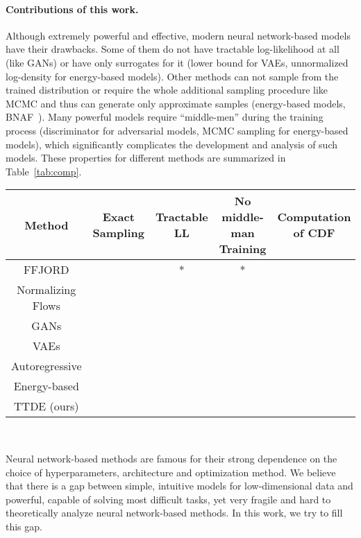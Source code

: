 \documentclass[accepted]{uai2021}
\newcommand{\cmark}{\color{green}{\ding{51}}}%
\newcommand{\xmark}{\color{red}{\ding{55}}}%
\begin{document}
  \paragraph{Contributions of this work.}
  Although extremely powerful and effective, modern neural network-based models have their drawbacks. Some of them do not have tractable log-likelihood at all (like GANs) or have only surrogates for it (lower bound for VAEs, unnormalized log-density for energy-based models). Other methods can not sample from the trained distribution or require the whole additional sampling procedure like MCMC and thus can generate only approximate samples (energy-based models, BNAF~\citep{DeCao2019}). Many powerful models require ``middle-men'' during the training process (discriminator for adversarial models, MCMC sampling for energy-based models), which significantly complicates the development and analysis of such models. These properties for different methods are summarized in Table~\ref{tab:comp}.

  \begin{table*}
    \centering
    \caption{Comparison of the capabilities of different density estimation models. *FFJORD does not use true log-likelihood in the training process and instead uses its unbiased estimate.} \label{tab:comp}
    \begin{tabular}{ccccc}
      \toprule %
      \bfseries Method & \bfseries Exact Sampling & \bfseries Tractable LL & \bfseries No middle-man Training & \bfseries Computation of CDF \\
      \midrule %
      FFJORD & \cmark & \cmark* & \cmark* & \xmark\\
      Normalizing Flows & \cmark & \cmark & \cmark  & \xmark\\
      GANs & \cmark & \xmark & \xmark  & \xmark\\
      VAEs & \cmark & \xmark & \cmark  & \xmark\\
      Autoregressive & \cmark & \cmark & \cmark  & \xmark\\
      Energy-based & \xmark & \xmark & \xmark  & \xmark\\
      \midrule
      TTDE (ours) & \cmark & \cmark & \cmark & \cmark \\
      \bottomrule %
    \end{tabular}
    \
  \end{table*}

  Neural network-based methods are famous for their strong dependence on the choice of hyperparameters, architecture and optimization method. We believe that there is a gap between simple, intuitive models for low-dimensional data and powerful, capable of solving most difficult tasks, yet very fragile and hard to theoretically analyze neural network-based methods. In this work, we try to fill this gap.
\end{document}
